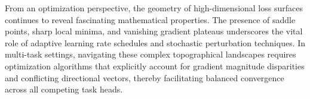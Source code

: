 \documentclass[Times,12pt,oneside,openany,print,index]{report}
\begin{document}
From an optimization perspective, the geometry of high-dimensional loss surfaces continues to reveal fascinating mathematical properties. The presence of saddle points, sharp local minima, and vanishing gradient plateaus underscores the vital role of adaptive learning rate schedules and stochastic perturbation techniques. In multi-task settings, navigating these complex topographical landscapes requires optimization algorithms that explicitly account for gradient magnitude disparities and conflicting directional vectors, thereby facilitating balanced convergence across all competing task heads.
\end{document}
